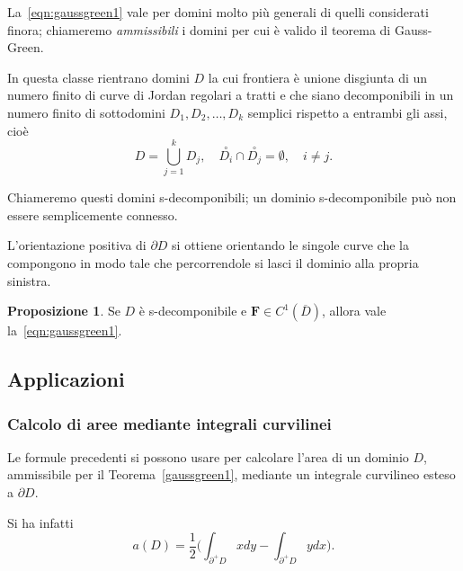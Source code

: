 \documentclass[a4paper]{book}
\numberwithin{equation}{section}
\theoremstyle{plain}
\theoremstyle{definition}
\newtheorem{prop}{Proposizione}[section]
\theoremstyle{remark}
\renewcommand{\vec}{\boldsymbol}
\theoremstyle{example}
\begin{document}
	La~\eqref{eqn:gaussgreen1} vale per domini molto più generali di quelli considerati finora; chiameremo \emph{ammissibili} i domini per cui è valido il teorema di Gauss-Green.

	In questa classe rientrano domini $D$ la cui frontiera è unione disgiunta di un numero finito di curve di Jordan regolari a tratti e che siano decomponibili in un numero finito di sottodomini $D_1, D_2, \dots, D_k$ semplici rispetto a entrambi gli assi, cioè
	\begin{equation*}
		D = \bigcup_{j=1}^k D_j, \quad \overset{\circ}{D_i} \cap \overset{\circ}{D_j} = \emptyset, \quad i \ne j.
	\end{equation*}

	Chiameremo questi domini s-decomponibili; un dominio s-decomponibile può non essere semplicemente connesso.

	L'orientazione positiva di $\partial D$ si ottiene orientando le singole curve che la compongono in modo tale che percorrendole si lasci il dominio alla propria sinistra.

	\begin{prop}
		Se $D$ è s-decomponibile e $\vec{F} \in C^1(\overline{D})$, allora vale la~\eqref{eqn:gaussgreen1}.
	\end{prop}

	\subsection{Applicazioni}

	\subsubsection*{Calcolo di aree mediante integrali curvilinei}
	Le formule precedenti si possono usare per calcolare l'area di un dominio $D$, ammissibile per il Teorema~\ref{gaussgreen1}, mediante un integrale curvilineo esteso a $\partial D$.

	Si ha infatti
	\begin{equation}
		a(D) = \frac{1}{2} \biggl( \int_{\partial^+D}x dy - \int_{\partial^+D}y dx \biggr).
	\end{equation}
\end{document}
